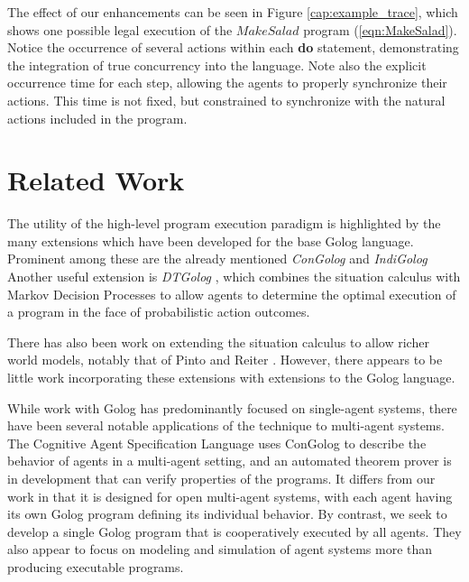 \documentclass[letterpaper]{article}
\begin{document}
The effect of our enhancements can be seen in Figure
\ref{cap:example_trace}, which shows one possible legal execution of the
$MakeSalad$ program (\ref{eqn:MakeSalad}). Notice the occurrence of several
actions within each \textbf{do} statement, demonstrating the integration
of true concurrency into the language.
Note also the explicit occurrence time for
each step, allowing the agents to properly synchronize their actions.
This time is not fixed, but constrained to synchronize with the natural
actions included in the program.

\section{Related Work}

The utility of the high-level program execution paradigm is highlighted
by the many extensions which have been developed for the base Golog
language. Prominent among these are the already mentioned \emph{ConGolog}
\cite{giacomo00congolog} and 
\emph{IndiGolog} \cite{giacomo99indigolog}
Another useful extension is \emph{DTGolog} \cite{boutilier00dtgolog}, which
combines the situation calculus with Markov Decision Processes to
allow agents to determine the optimal execution of a program in the face
of probabilistic action outcomes.

There has also been work on extending the situation calculus to allow
richer world models, notably that of Pinto \cite{pinto94temporal}
and Reiter \cite{reiter96sc_nat_conc}. 
However, there appears to be little work incorporating these
extensions with extensions to the Golog language.

While work with Golog has predominantly focused on single-agent systems,
there have been several notable applications of the technique to multi-agent
systems. The Cognitive Agent Specification Language \cite{shapiro02casl}
uses ConGolog to describe the behavior of agents in a multi-agent
setting, and an automated theorem prover is in development that can
verify properties of the programs. It differs from our work in that
it is designed for open multi-agent systems, with each agent having
its own Golog program defining its individual behavior. By contrast, we seek
to develop a single Golog program that is cooperatively executed by
all agents. They also appear to focus on modeling and simulation
of agent systems more than producing executable programs.
\end{document}
